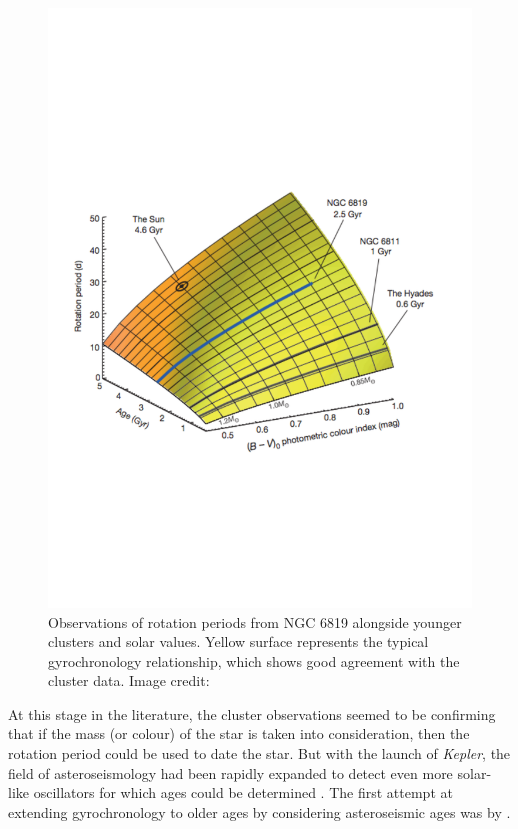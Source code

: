 \begin{figure}
    \centering
    \includegraphics[scale=0.55]{Figures/2-Historical_overview/meibom_etal_2015.pdf}
    \caption[Comparison of data from 2.5 Gyr old cluster to previous gyrochronology relationship]{Observations of rotation periods from NGC 6819 alongside younger clusters and solar values. Yellow surface represents the typical gyrochronology relationship, which shows good agreement with the cluster data. Image credit: \citet{Meibom_etal_2015}}
    \label{fig:Meibom_etal_2015_plot}
\end{figure}

At this stage in the literature, the cluster observations seemed to be confirming that if the mass (or colour) of the star is taken into consideration, then the rotation period could be used to date the star. But with the launch of \textit{Kepler}, the field of asteroseismology had been rapidly expanded to detect even more solar-like oscillators for which ages could be determined \citep{Chaplin_etal_2011}. The first attempt at extending gyrochronology to older ages by considering asteroseismic ages was by \citet{Angus_etal_2015}.

